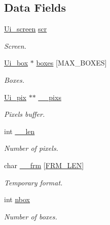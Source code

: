 \subsection*{Data Fields}
\begin{DoxyCompactItemize}
\item 
\mbox{\label{struct__Ui_abd7c2a78bbdbe0e91a47a1461660b747}} 
\hyperlink{struct__Ui__screen}{Ui\+\_\+screen} \hyperlink{struct__Ui_abd7c2a78bbdbe0e91a47a1461660b747}{scr}
\begin{DoxyCompactList}\small\item\em Screen. \end{DoxyCompactList}\item 
\mbox{\label{struct__Ui_a04ed2c273edd9ab846366eeaba66f097}} 
\hyperlink{struct__Ui__box}{Ui\+\_\+box} $\ast$ \hyperlink{struct__Ui_a04ed2c273edd9ab846366eeaba66f097}{boxes} \mbox{[}M\+A\+X\+\_\+\+B\+O\+X\+ES\mbox{]}
\begin{DoxyCompactList}\small\item\em Boxes. \end{DoxyCompactList}\item 
\mbox{\label{struct__Ui_a11af896bffe4bdbeca5ca871f7a9b7f0}} 
\hyperlink{struct__Ui__pix}{Ui\+\_\+pix} $\ast$$\ast$ \hyperlink{struct__Ui_a11af896bffe4bdbeca5ca871f7a9b7f0}{\+\_\+\+\_\+pixs}
\begin{DoxyCompactList}\small\item\em Pixels buffer. \end{DoxyCompactList}\item 
\mbox{\label{struct__Ui_a368b423615ed2b6852c1ca99fd6351ce}} 
int \hyperlink{struct__Ui_a368b423615ed2b6852c1ca99fd6351ce}{\+\_\+\+\_\+len}
\begin{DoxyCompactList}\small\item\em Number of pixels. \end{DoxyCompactList}\item 
\mbox{\label{struct__Ui_a6fa9582f3825e06799573007e6cfe9e8}} 
char \hyperlink{struct__Ui_a6fa9582f3825e06799573007e6cfe9e8}{\+\_\+\+\_\+frm} \mbox{[}\hyperlink{ui_8c_a06eb930d834d042bf22819174e0158a6}{F\+R\+M\+\_\+\+L\+EN}\mbox{]}
\begin{DoxyCompactList}\small\item\em Temporary format. \end{DoxyCompactList}\item 
\mbox{\label{struct__Ui_a882104c9e9b8c457e121c83a70573205}} 
int \hyperlink{struct__Ui_a882104c9e9b8c457e121c83a70573205}{nbox}
\begin{DoxyCompactList}\small\item\em Number of boxes. \end{DoxyCompactList}\end{DoxyCompactItemize}


